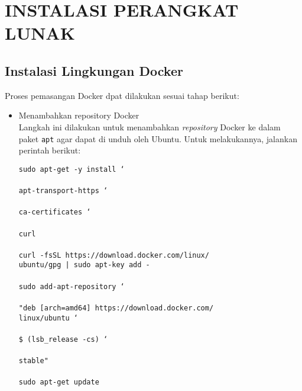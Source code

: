 \chapter{INSTALASI PERANGKAT LUNAK}

\section*{Instalasi Lingkungan Docker}
	Proses pemasangan Docker dpat dilakukan sesuai tahap berikut:
    \begin{itemize}
    \item Menambahkan repository Docker\\
    	Langkah ini dilakukan untuk menambahkan \textit{repository} Docker ke dalam paket \texttt{apt} agar dapat di unduh oleh Ubuntu. Untuk melakukannya, jalankan perintah berikut:
		\begin{tabbing}
          \texttt{sudo apt-get -y install \char`\\} \\
          \hspace{5 mm} \texttt{apt-transport-https \char`\\} \\
          \hspace{5 mm} \texttt{ca-certificates \char`\\} \\
          \hspace{5 mm} \texttt{curl} \\
          \\
          \texttt{curl -fsSL https://download.docker.com/linux/} \\
          \hspace{7 mm} \texttt{ubuntu/gpg | sudo apt-key add -} \\
          \\
          \texttt{sudo add-apt-repository \char`\\} \\
          \hspace{7 mm} \texttt{"deb [arch=amd64] https://download.docker.com/} \\
          \hspace{9 mm} \texttt{linux/ubuntu \char`\\} \\
          \hspace{7 mm} \texttt{\$ (lsb\_release -cs) \char`\\} \\
          \hspace{7 mm} \texttt{stable"} \\
          \\
          \texttt{sudo apt-get update} \\
        \end{tabbing}
        

\end{itemize}
